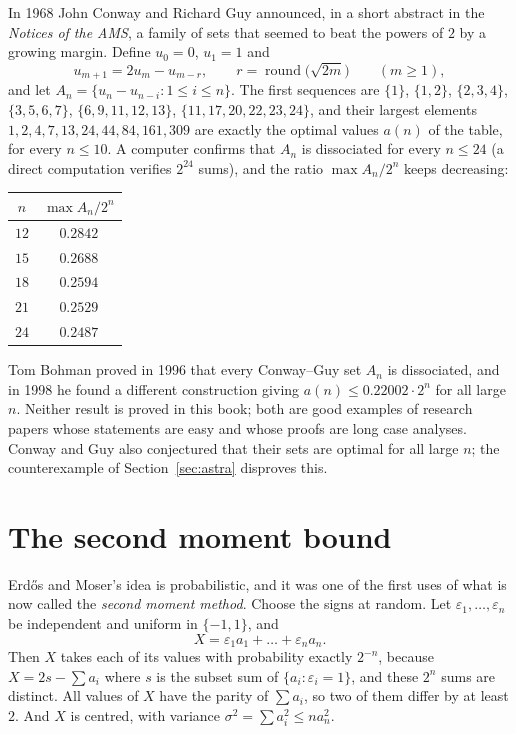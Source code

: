 In 1968 John Conway and Richard Guy announced, in a short abstract in the \emph{Notices of the AMS}, a family of sets that seemed to beat the
powers of $2$ by a growing margin. Define $u_0=0$, $u_1=1$ and
\[
u_{m+1}=2u_m-u_{m-r},\qquad r=\operatorname{round}\bigl(\sqrt{2m}\bigr)\qquad(m\ge1),
\]
and let $A_n=\{u_n-u_{n-i}:1\le i\le n\}$. The first sequences are $\{1\}$, $\{1,2\}$, $\{2,3,4\}$, $\{3,5,6,7\}$, $\{6,9,11,12,13\}$, $\{11,17,20,22,23,24\}$,
and their largest elements $1,2,4,7,13,24,44,84,161,309$ are exactly the optimal values $a(n)$ of the table, for every $n\le10$. A computer
confirms that $A_n$ is dissociated for every $n\le24$ (a direct computation verifies $2^{24}$ sums), and the ratio $\max A_n/2^n$ keeps decreasing:
\begin{center}
\begin{tabular}{c|c}
$n$&$\max A_n/2^n$\\\hline
$12$&$0.2842$\\
$15$&$0.2688$\\
$18$&$0.2594$\\
$21$&$0.2529$\\
$24$&$0.2487$\\
\end{tabular}
\end{center}

\begin{remark}
Tom Bohman proved in 1996 that every Conway--Guy set $A_n$ is dissociated, and in 1998 he found a different construction giving
$a(n)\le0.22002\cdot2^n$ for all large $n$. Neither result is proved in this book; both are good examples of research papers whose
statements are easy and whose proofs are long case analyses. Conway and Guy also conjectured that their sets are optimal for all large
$n$; the counterexample of Section~\ref{sec:astra} disproves this.
\end{remark}

\section{The second moment bound}

Erd\H os and Moser's idea is probabilistic, and it was one of the first uses of what is now called the \emph{second moment method}.
Choose the signs at random. Let $\varepsilon_1,\dots,\varepsilon_n$ be independent and uniform in $\{-1,1\}$, and
\[
X=\varepsilon_1a_1+\dots+\varepsilon_na_n.
\]
Then $X$ takes each of its values with probability exactly $2^{-n}$, because $X=2s-\sum a_i$ where $s$ is the subset sum of
$\{a_i:\varepsilon_i=1\}$, and these $2^n$ sums are distinct. All values of $X$ have the parity of $\sum a_i$, so two of them differ by at least $2$.
And $X$ is centred, with variance $\sigma^2=\sum a_i^2\le na_n^2$.

